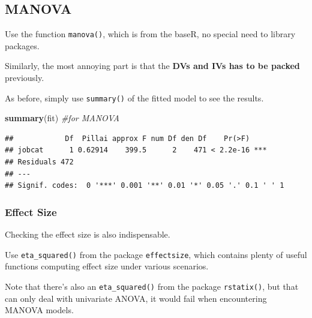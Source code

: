 \documentclass[
]{ctexart}
\newenvironment{Shaded}{\begin{snugshade}}{\end{snugshade}}
\newcommand{\CommentTok}[1]{\textcolor[rgb]{0.56,0.35,0.01}{\textit{#1}}}
\newcommand{\FunctionTok}[1]{\textcolor[rgb]{0.13,0.29,0.53}{\textbf{#1}}}
\newcommand{\NormalTok}[1]{#1}
\newcommand{\OtherTok}[1]{\textcolor[rgb]{0.56,0.35,0.01}{#1}}
\newcommand{\SpecialCharTok}[1]{\textcolor[rgb]{0.81,0.36,0.00}{\textbf{#1}}}
\begin{document}
\hypertarget{manova-1}{%
\subsection{MANOVA}\label{manova-1}}

Use the function \texttt{manova()}, which is from the baseR, no special
need to library packages.

Similarly, the most annoying part is that the \textbf{DVs and IVs has to
be packed} previously.

\begin{Shaded}
\end{Shaded}

As before, simply use \texttt{summary()} of the fitted model to see the
results.

\begin{Shaded}
\begin{Highlighting}[]
\FunctionTok{summary}\NormalTok{(fit)  }\CommentTok{\#for MANOVA}
\end{Highlighting}
\end{Shaded}

\begin{verbatim}
##            Df  Pillai approx F num Df den Df    Pr(>F)    
## jobcat      1 0.62914    399.5      2    471 < 2.2e-16 ***
## Residuals 472                                             
## ---
## Signif. codes:  0 '***' 0.001 '**' 0.01 '*' 0.05 '.' 0.1 ' ' 1
\end{verbatim}

\hypertarget{effect-size-2}{%
\subsubsection{Effect Size}\label{effect-size-2}}

Checking the effect size is also indispensable.

Use \texttt{eta\_squared()} from the package \texttt{effectsize}, which
contains plenty of useful functions computing effect size under various
scenarios.

Note that there's also an \texttt{eta\_squared()} from the package
\texttt{rstatix()}, but that can only deal with univariate ANOVA, it
would fail when encountering MANOVA models.
\end{document}
